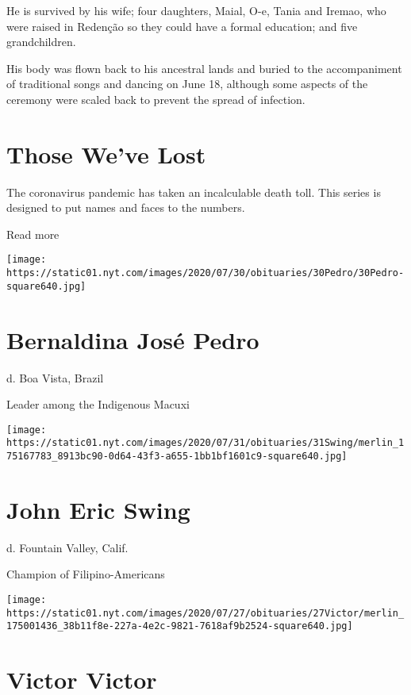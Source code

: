 He is survived by his wife; four daughters, Maial, O-e, Tania and
Iremao, who were raised in Redenção so they could have a formal
education; and five grandchildren.

His body was flown back to his ancestral lands and buried to the
accompaniment of traditional songs and dancing on June 18, although some
aspects of the ceremony were scaled back to prevent the spread of
infection.

\href{https://www.nytimes.com/interactive/2020/obituaries/people-died-coronavirus-obituaries.html?action=click\&pgtype=Article\&state=default\&region=BELOW_MAIN_CONTENT\&context=covid_obits_promo}{}

\hypertarget{those-weve-lost}{%
\section{Those We've Lost}\label{those-weve-lost}}

The coronavirus pandemic has taken an incalculable death toll. This
series is designed to put names and faces to the numbers.

Read more

\texttt{[image: https://static01.nyt.com/images/2020/07/30/obituaries/30Pedro/30Pedro-square640.jpg]}

\hypertarget{bernaldina-josuxe9-pedro}{%
\section{Bernaldina José Pedro}\label{bernaldina-josuxe9-pedro}}

d. Boa Vista, Brazil

Leader among the Indigenous Macuxi

\texttt{[image: https://static01.nyt.com/images/2020/07/31/obituaries/31Swing/merlin\_175167783\_8913bc90-0d64-43f3-a655-1bb1bf1601c9-square640.jpg]}

\hypertarget{john-eric-swing}{%
\section{John Eric Swing}\label{john-eric-swing}}

d. Fountain Valley, Calif.

Champion of Filipino-Americans

\texttt{[image: https://static01.nyt.com/images/2020/07/27/obituaries/27Victor/merlin\_175001436\_38b11f8e-227a-4e2c-9821-7618af9b2524-square640.jpg]}

\hypertarget{victor-victor}{%
\section{Victor Victor}\label{victor-victor}}

